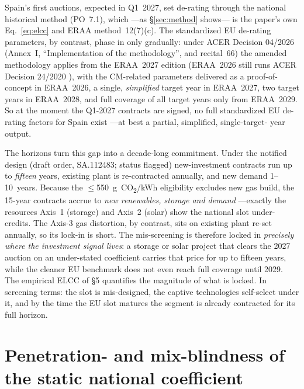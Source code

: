 \documentclass[11pt,a4paper]{article}
\begin{document}
Spain's first auctions, expected in Q1~2027, set de-rating through the national
historical method (PO~7.1), which ---as \S\ref{sec:method} shows--- is the paper's
own Eq.~\ref{eq:elcc} and ERAA method~12(7)(c). The standardized EU de-rating
parameters, by contrast, phase in only gradually: under ACER Decision 04/2026
\citep{acer042026} (Annex~I, ``Implementation of the methodology'', and recital~66)
the amended methodology applies from the ERAA~2027 edition (ERAA~2026 still runs ACER
Decision 24/2020 \citep{acer242020}), with the CM-related parameters delivered as a
proof-of-concept in ERAA~2026, a single, \emph{simplified} target year in ERAA~2027,
two target years in ERAA~2028, and full coverage of all target years only from
ERAA~2029. So at the moment the Q1-2027 contracts are signed, no full standardized
EU de-rating factors for Spain exist ---at best a partial, simplified, single-target-
year output.

The horizons turn this gap into a decade-long commitment. Under the notified design
(draft order, SA.112483; status flagged) new-investment contracts run up to
\emph{fifteen} years, existing plant is re-contracted annually, and new demand
1--10~years. Because the $\le$550~g~CO\textsubscript{2}/kWh eligibility excludes
new gas build, the 15-year contracts accrue to \emph{new renewables, storage and
demand} ---exactly the resources Axis~1 (storage) and Axis~2 (solar) show the national
slot under-credits. The Axis-3 gas distortion, by contrast, sits on existing plant
re-set annually, so its lock-in is short. The mis-screening is therefore locked in
\emph{precisely where the investment signal lives}: a storage or solar project that
clears the 2027 auction on an under-stated coefficient carries that price for up to
fifteen years, while the cleaner EU benchmark does not even reach full coverage until
2029. The empirical ELCC of \S5 quantifies the magnitude of what is locked. In
screening terms: the slot is mis-designed, the captive technologies self-select under
it, and by the time the EU slot matures the segment is already contracted for its full
horizon.

\section{Penetration- and mix-blindness of the static national coefficient}
\label{sec:penetration}
\end{document}
